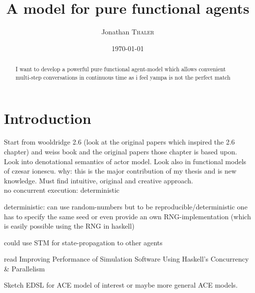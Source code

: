\documentclass{article}
\title{A model for pure functional agents} %
\author{Jonathan \textsc{Thaler}}
\date{\today}
\begin{document}
\maketitle 

\begin{abstract}
I want to develop a powerful pure functional agent-model which allows convenient multi-step conversations in continuous time as i feel yampa is not the perfect match
\end{abstract}

\section{Introduction}
Start from wooldridge 2.6 (look at the original papers which inspired the 2.6 chapter) and weiss book and the original papers those chapter is based upon. Look into denotational semantics of actor model. Look also in functional models of czesar ionescu. why: this is the major contribution of my thesis and is new knowledge. Must find intuitive, original and creative approach. \\

no concurrent execution: deterministic

deterministic: can use random-numbers but to be reproducible/deterministic one has to specify the same seed or even provide an own RNG-implementation (which is easily possible using the RNG in haskell)

could use STM for state-propagation to other agents

read Improving Performance of Simulation Software Using Haskell’s Concurrency \& Parallelism

Sketch EDSL for ACE model of interest or maybe more general ACE models.





\end{document}
